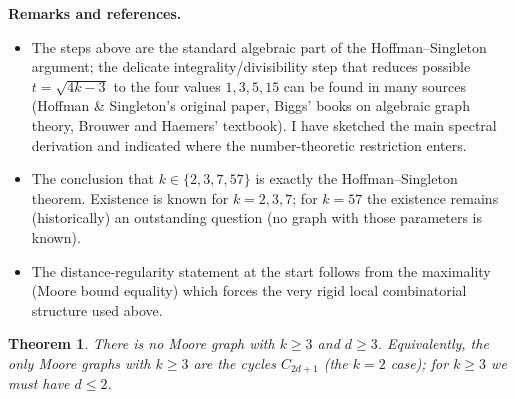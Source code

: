 \documentclass[12pt,a4paper,openany]{book}
\newtheorem{theorem}{Theorem}[section]
\begin{document}
\bigskip
\noindent\textbf{Remarks and references.}
\begin{itemize}
  \item The steps above are the standard algebraic part of the
    Hoffman–Singleton argument; the delicate integrality/divisibility
    step that reduces possible \(t=\sqrt{4k-3}\) to the four values
    \(1,3,5,15\) can be found in many sources (Hoffman \& Singleton's
    original paper, Biggs' books on algebraic graph theory, Brouwer and
    Haemers' textbook). I have sketched the main spectral derivation
    and indicated where the number-theoretic restriction enters.
  \item The conclusion that \(k\in\{2,3,7,57\}\) is exactly the
    Hoffman–Singleton theorem. Existence is known for \(k=2,3,7\); for
    \(k=57\) the existence remains (historically) an outstanding
    question (no graph with those parameters is known).
  \item The distance-regularity statement at the start follows from the
    maximality (Moore bound equality) which forces the very rigid local
    combinatorial structure used above.
\end{itemize}








\begin{theorem}
There is no Moore graph with $k\ge 3$ and $d\ge 3$.  Equivalently, the
only Moore graphs with $k\ge3$ are the cycles $C_{2d+1}$ (the $k=2$
case); for $k\ge3$ we must have $d\le2$.
\end{theorem}
\end{document}
